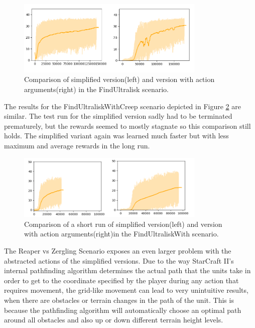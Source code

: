 \begin{figure}[htb]
  \centering
      \includegraphics[width=0.8\textwidth]{Figures/plots/acktr_fu_simplevs.png}
  \caption{Comparison of simplified version(left) and version with action arguments(right) in the FindUltralisk scenario.}
  \label{fig:simplevs_fu}
\end{figure}

The results for the FindUltraliskWithCreep scenario depicted in Figure \ref{fig:simplevs_fuwc} are similar. The test run for the simplified version sadly had to be terminated prematurely, but the rewards seemed to mostly stagnate so this comparison still holds. The simplified variant again was learned much faster but with less maximum and average rewards in the long run.
\begin{figure}[htb]
  \centering
      \includegraphics[width=0.8\textwidth]{Figures/plots/fuwc_simplevs.png}
  \caption{Comparison of a short run of simplified version(left) and version with action arguments(right)in the FindUltraliskWith scenario.}
  \label{fig:simplevs_fuwc}
\end{figure}

The Reaper vs Zergling Scenario exposes an even larger problem with the abstracted actions of the simplified versions. Due to the way StarCraft II's internal pathfinding algorithm determines the actual path that the units take in order to get to the coordinate specified by the player during any action that requires movement, the grid-like movement can lead to very unintuitive results, when there are obstacles or terrain changes in the path of the unit. This is because the pathfinding algorithm will automatically choose an optimal path around all obstacles and also up or down different terrain height levels.

